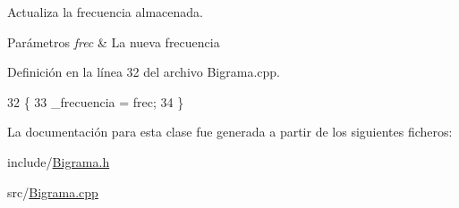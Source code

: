 Actualiza la frecuencia almacenada. 


\begin{DoxyParams}{Parámetros}
{\em frec} & La nueva frecuencia \\
\hline
\end{DoxyParams}


Definición en la línea 32 del archivo Bigrama.\+cpp.


\begin{DoxyCode}
32                                     \{
33     \_frecuencia = frec;
34 \}
\end{DoxyCode}


La documentación para esta clase fue generada a partir de los siguientes ficheros\+:\begin{DoxyCompactItemize}
\item 
include/\hyperlink{Bigrama_8h}{Bigrama.\+h}\item 
src/\hyperlink{Bigrama_8cpp}{Bigrama.\+cpp}\end{DoxyCompactItemize}
